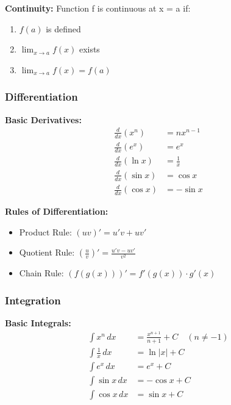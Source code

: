 \documentclass[11pt,a4paper]{article}
\begin{document}
\begin{defbox}
\textbf{Continuity:} Function f is continuous at x = a if:
\begin{enumerate}
    \item $f(a)$ is defined
    \item $\lim_{x \to a} f(x)$ exists
    \item $\lim_{x \to a} f(x) = f(a)$
\end{enumerate}
\end{defbox}

\subsubsection{Differentiation}

\begin{formulabox}
\textbf{Basic Derivatives:}
\begin{align*}
    \frac{d}{dx}(x^n) &= nx^{n-1} \\
    \frac{d}{dx}(e^x) &= e^x \\
    \frac{d}{dx}(\ln x) &= \frac{1}{x} \\
    \frac{d}{dx}(\sin x) &= \cos x \\
    \frac{d}{dx}(\cos x) &= -\sin x
\end{align*}
\end{formulabox}

\textbf{Rules of Differentiation:}
\begin{itemize}
    \item Product Rule: $(uv)' = u'v + uv'$
    \item Quotient Rule: $\left(\frac{u}{v}\right)' = \frac{u'v - uv'}{v^2}$
    \item Chain Rule: $(f(g(x)))' = f'(g(x)) \cdot g'(x)$
\end{itemize}

\subsubsection{Integration}

\begin{formulabox}
\textbf{Basic Integrals:}
\begin{align*}
    \int x^n \, dx &= \frac{x^{n+1}}{n+1} + C \quad (n \neq -1) \\
    \int \frac{1}{x} \, dx &= \ln|x| + C \\
    \int e^x \, dx &= e^x + C \\
    \int \sin x \, dx &= -\cos x + C \\
    \int \cos x \, dx &= \sin x + C
\end{align*}
\end{formulabox}
\end{document}
